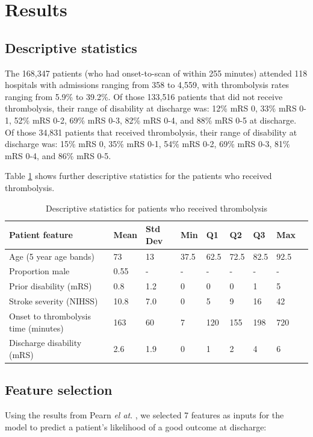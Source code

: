 \section{Results}

\subsection{Descriptive statistics}

The 168,347 patients (who had onset-to-scan of within 255 minutes) attended 118 hospitals with admissions ranging from 358 to 4,559, with thrombolysis rates ranging from 5.9\% to 39.2\%. Of those 133,516 patients that did not receive thrombolysis, their range of disability at discharge was: 12\% mRS 0, 33\% mRS 0-1, 52\% mRS 0-2, 69\% mRS 0-3, 82\% mRS 0-4, and 88\% mRS 0-5 at discharge. Of those 34,831 patients that received thrombolysis, their range of disability at discharge was: 15\% mRS 0, 35\% mRS 0-1, 54\% mRS 0-2, 69\% mRS 0-3, 81\% mRS 0-4, and 86\% mRS 0-5.

Table \ref{tab:descriptive_stats} shows further descriptive statistics for the patients who received thrombolysis.

\begin{minipage}{1\textwidth}
\small
\renewcommand{\arraystretch}{1.2}
\begin{longtable}[]{@{}lllllllll@{}}
\caption{Descriptive statistics for patients who received thrombolysis}\label{tab:descriptive_stats}\\
\toprule
Patient feature &  Mean & Std Dev & Min & Q1 & Q2 & Q3 & Max\tabularnewline
\endhead
\midrule
Age (5 year age bands) & 73 & 13 & 37.5 & 62.5 & 72.5 & 82.5 & 92.5\tabularnewline
Proportion male & 0.55 & - & - & - & - & - & -\tabularnewline
Prior disability (mRS) & 0.8 & 1.2 & 0 & 0 & 0 & 1 & 5\tabularnewline
Stroke severity (NIHSS) & 10.8 & 7.0 & 0 & 5 & 9 & 16 & 42\tabularnewline
Onset to thrombolysis time (minutes) &  163 & 60 & 7 & 120 & 155 & 198 & 720\tabularnewline
Discharge disability (mRS) &  2.6 & 1.9 & 0 & 1 & 2 & 4 & 6\tabularnewline
\bottomrule

\end{longtable}
\normalsize
\end{minipage}

\subsection{Feature selection}

Using the results from Pearn \textit{el at}. \cite{pearn_are_2024}, we selected 7 features as inputs for the model to predict a patient's likelihood of a good outcome at discharge:

